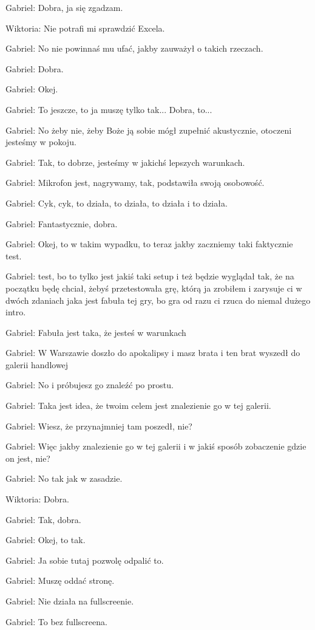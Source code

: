 Gabriel: Dobra, ja się zgadzam.

Wiktoria: Nie potrafi mi sprawdzić Excela.

Gabriel: No nie powinnaś mu ufać, jakby zauważył o takich rzeczach.

Gabriel: Dobra.

Gabriel: Okej.

Gabriel: To jeszcze, to ja muszę tylko tak... Dobra, to...

Gabriel: No żeby nie, żeby Boże ją sobie mógł zupełnić akustycznie, otoczeni jesteśmy w pokoju.

Gabriel: Tak, to dobrze, jesteśmy w jakichś lepszych warunkach.

Gabriel: Mikrofon jest, nagrywamy, tak, podstawiła swoją osobowość.

Gabriel: Cyk, cyk, to działa, to działa, to działa i to działa.

Gabriel: Fantastycznie, dobra.

Gabriel: Okej, to w takim wypadku, to teraz jakby zaczniemy taki faktycznie test.

Gabriel: test, bo to tylko jest jakiś taki setup i też będzie wyglądał tak, że na początku będę chciał, żebyś przetestowała grę, którą ja zrobiłem i zarysuje ci w dwóch zdaniach jaka jest fabuła tej gry, bo gra od razu ci rzuca do niemal dużego intro.

Gabriel: Fabuła jest taka, że jesteś w warunkach

Gabriel: W Warszawie doszło do apokalipsy i masz brata i ten brat wyszedł do galerii handlowej

Gabriel: No i próbujesz go znaleźć po prostu.

Gabriel: Taka jest idea, że twoim celem jest znalezienie go w tej galerii.

Gabriel: Wiesz, że przynajmniej tam poszedł, nie?

Gabriel: Więc jakby znalezienie go w tej galerii i w jakiś sposób zobaczenie gdzie on jest, nie?

Gabriel: No tak jak w zasadzie.

Wiktoria: Dobra.

Gabriel: Tak, dobra.

Gabriel: Okej, to tak.

Gabriel: Ja sobie tutaj pozwolę odpalić to.

Gabriel: Muszę oddać stronę.

Gabriel: Nie działa na fullscreenie.

Gabriel: To bez fullscreena.

